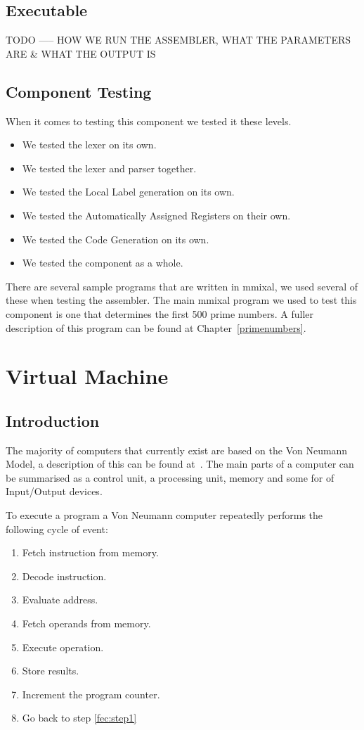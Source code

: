 \documentclass[a4paper,11pt]{report}
\begin{document}
\section{Executable}
TODO ----- HOW WE RUN THE ASSEMBLER, WHAT THE PARAMETERS ARE \& WHAT THE OUTPUT IS
\section{Component Testing}
When it comes to testing this component we tested it these levels.
\begin{itemize}
\item We tested the lexer on its own.
\item We tested the lexer and parser together.
\item We tested the Local Label generation on its own.
\item We tested the Automatically Assigned Registers on their own.
\item We tested the Code Generation on its own.
\item We tested the component as a whole.
\end{itemize}

There are several sample programs that are written in mmixal, we used several of these when testing the assembler. The main mmixal program we used to test this component is one that determines the first 500 prime numbers. A fuller description of this program can be found at Chapter~\ref{primenumbers}.
\chapter{Virtual Machine}\label{VM}
\section{Introduction}
The majority of computers that currently exist are based on the Von Neumann Model, a description of this can be found at~\cite{vnmodel}. The main parts of a computer can be summarised as a control unit, a processing unit, memory and some for of Input/Output devices.

To execute a program a Von Neumann computer repeatedly performs the following cycle of event:
\begin{enumerate}
\item Fetch instruction from memory.\label{fec:step1}
\item Decode instruction.
\item Evaluate address.
\item Fetch operands from memory.
\item Execute operation.
\item Store results.
\item Increment the program counter.
\item Go back to step \ref{fec:step1}
\end{enumerate}
\end{document}
